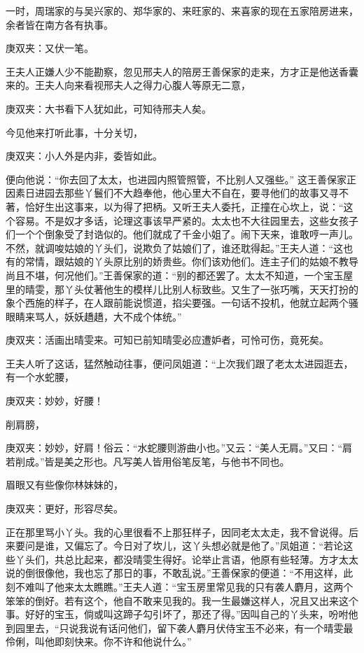 \begin{parag}
    一时，周瑞家的与吴兴家的、郑华家的、来旺家的、来喜家的现在五家陪房进来，余者皆在南方各有执事。\begin{note}庚双夹：又伏一笔。\end{note}王夫人正嫌人少不能勘察，忽见邢夫人的陪房王善保家的走来，方才正是他送香囊来的。王夫人向来看视邢夫人之得力心腹人等原无二意，\begin{note}庚双夹：大书看下人犹如此，可知待邢夫人矣。\end{note}今见他来打听此事，十分关切，\begin{note}庚双夹：小人外是内非，委皆如此。\end{note}便向他说：“你去回了太太，也进园内照管照管，不比别人又强些。” 这王善保家正因素日进园去那些丫鬟们不大趋奉他，他心里大不自在，要寻他们的故事又寻不著，恰好生出这事来，以为得了把柄。又听王夫人委托，正撞在心坎上，说：“这个容易。不是奴才多话，论理这事该早严紧的。太太也不大往园里去，这些女孩子们一个个倒象受了封诰似的。他们就成了千金小姐了。闹下天来，谁敢哼一声儿。不然，就调唆姑娘的丫头们，说欺负了姑娘们了，谁还耽得起。”王夫人道：“这也有的常情，跟姑娘的丫头原比别的娇贵些。你们该劝他们。连主子们的姑娘不教导尚且不堪，何况他们。”王善保家的道：“别的都还罢了。太太不知道，一个宝玉屋里的晴雯，那丫头仗著他生的模样儿比别人标致些。又生了一张巧嘴，天天打扮的象个西施的样子，在人跟前能说惯道，掐尖要强。一句话不投机，他就立起两个骚眼睛来骂人，妖妖趫趫，大不成个体统。”\begin{note}庚双夹：活画出晴雯来。可知已前知晴雯必应遭妒者，可怜可伤，竟死矣。\end{note}王夫人听了这话，猛然触动往事，便问凤姐道：“上次我们跟了老太太进园逛去，有一个水蛇腰，\begin{note}庚双夹：妙妙，好腰！\end{note}削肩膀，\begin{note}庚双夹：妙妙，好肩！俗云：“水蛇腰则游曲小也。”又云：“美人无肩。”又曰：“肩若削成。”皆是美之形也。凡写美人皆用俗笔反笔，与他书不同也。\end{note}眉眼又有些像你林妹妹的，\begin{note}庚双夹：更好，形容尽矣。\end{note}正在那里骂小丫头。我的心里很看不上那狂样子，因同老太太走，我不曾说得。后来要问是谁，又偏忘了。今日对了坎儿，这丫头想必就是他了。”凤姐道：“若论这些丫头们，共总比起来，都没晴雯生得好。论举止言语，他原有些轻薄。方才太太说的倒很像他，我也忘了那日的事，不敢乱说。”王善保家的便道：“不用这样，此刻不难叫了他来太太瞧瞧。”王夫人道：“宝玉房里常见我的只有袭人麝月，这两个笨笨的倒好。若有这个，他自不敢来见我的。我一生最嫌这样人，况且又出来这个事。好好的宝玉，倘或叫这蹄子勾引坏了，那还了得。”因叫自己的丫头来，吩咐他到园里去，“只说我说有话问他们，留下袭人麝月伏侍宝玉不必来，有一个晴雯最伶俐，叫他即刻快来。你不许和他说什么。”
\end{parag}


